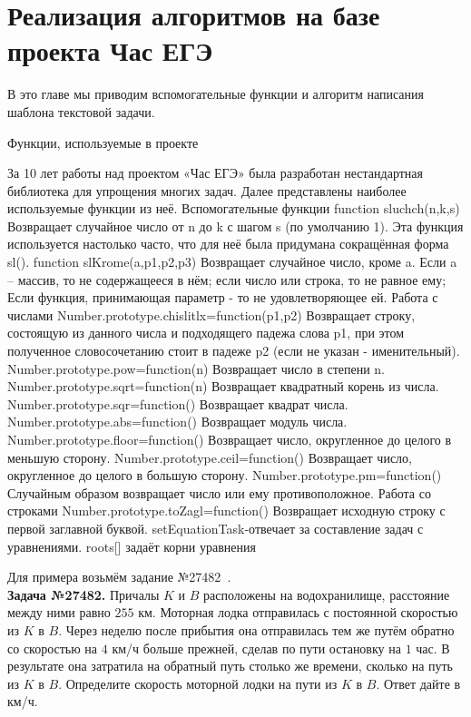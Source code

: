 
\section{Реализация алгоритмов на базе проекта Час ЕГЭ}
В это главе мы приводим вспомогательные функции и алгоритм написания шаблона текстовой задачи.

Функции, используемые в проекте

За 10 лет работы над проектом «Час ЕГЭ» была разработан нестандартная библиотека для упрощения многих задач. Далее представлены наиболее используемые функции из неё.
Вспомогательные функции
function sluchch(n,k,s) Возвращает случайное число от n до k с шагом s (по умолчанию 1). Эта функция используется настолько часто, что для неё была придумана сокращённая форма sl(). function slKrome(a,p1,p2,p3) Возвращает случайное число, кроме a. Если a – массив, то не содержащееся в нём; если число или строка, то не равное ему; Если функция, принимающая параметр - то не удовлетворяющее ей.
Работа с числами 
Number.prototype.chislitlx=function(p1,p2) Возвращает строку, состоящую из данного числа и подходящего падежа слова p1, при этом полученное словосочетанию стоит в падеже p2 (если не указан - именительный).
Number.prototype.pow=function(n) Возвращает число в степени n. 
Number.prototype.sqrt=function(n) Возвращает квадратный корень из числа. 
Number.prototype.sqr=function() Возвращает квадрат числа. 
Number.prototype.abs=function() Возвращает модуль числа. 
Number.prototype.floor=function() Возвращает число, округленное до целого в меньшую сторону. 
Number.prototype.ceil=function() Возвращает число, округленное до целого в большую сторону. 
Number.prototype.pm=function() Случайным образом возвращает число или ему противоположное. 
Работа со строками 
Number.prototype.toZagl=function() Возвращает исходную строку с первой заглавной буквой.
setEquationTask-отвечает за составление задач с уравнениями.
roots[] задаёт корни уравнения

Для примера возьмём задание №27482~\cite{egemath}.
\\
\textbf{Задача №27482.}
Причалы $K$ и $B$ расположены на водохранилище, расстояние между ними равно $255$ км. Моторная лодка отправилась с постоянной скоростью из $K$ в $B$. Через неделю после прибытия она отправилась тем же путём обратно со скоростью на $4$ км/ч больше прежней, сделав по пути остановку на $1$ час. В результате она затратила на обратный путь столько же времени, сколько на путь из $K$ в $B$. Определите скорость моторной лодки на пути из $K$ в $B$. Ответ дайте в км/ч.\\ 

